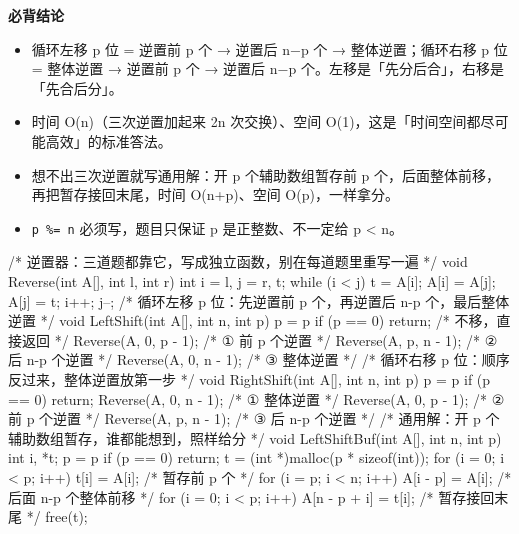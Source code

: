 \documentclass[10pt,a4paper]{ctexart}
\begin{document}



\textbf{必背结论}

\begin{itemize}

\item 循环左移 p 位 = 逆置前 p 个 → 逆置后 n−p 个 → 整体逆置；循环右移 p 位 = 整体逆置 → 逆置前 p 个 → 逆置后 n−p 个。左移是「先分后合」，右移是「先合后分」。

\item 时间 O(n)（三次逆置加起来 2n 次交换）、空间 O(1)，这是「时间空间都尽可能高效」的标准答法。

\item 想不出三次逆置就写通用解：开 p 个辅助数组暂存前 p 个，后面整体前移，再把暂存接回末尾，时间 O(n+p)、空间 O(p)，一样拿分。

\item \texttt{p \%= n} 必须写，题目只保证 p 是正整数、不一定给 p < n。

\end{itemize}

\begin{codebox}
/* 逆置器：三道题都靠它，写成独立函数，别在每道题里重写一遍 */
void Reverse(int A[], int l, int r) {
    int i = l, j = r, t;
    while (i < j) { t = A[i]; A[i] = A[j]; A[j] = t; i++; j--; }
}
/* 循环左移 p 位：先逆置前 p 个，再逆置后 n-p 个，最后整体逆置 */
void LeftShift(int A[], int n, int p) {
    p = p %
    if (p == 0) return;              /* 不移，直接返回 */
    Reverse(A, 0, p - 1);            /* ① 前 p 个逆置 */
    Reverse(A, p, n - 1);            /* ② 后 n-p 个逆置 */
    Reverse(A, 0, n - 1);            /* ③ 整体逆置 */
}
/* 循环右移 p 位：顺序反过来，整体逆置放第一步 */
void RightShift(int A[], int n, int p) {
    p = p %
    if (p == 0) return;
    Reverse(A, 0, n - 1);            /* ① 整体逆置 */
    Reverse(A, 0, p - 1);            /* ② 前 p 个逆置 */
    Reverse(A, p, n - 1);            /* ③ 后 n-p 个逆置 */
}
/* 通用解：开 p 个辅助数组暂存，谁都能想到，照样给分 */
void LeftShiftBuf(int A[], int n, int p) {
    int i, *t;
    p = p %
    if (p == 0) return;
    t = (int *)malloc(p * sizeof(int));
    for (i = 0; i < p; i++) t[i] = A[i];      /* 暂存前 p 个 */
    for (i = p; i < n; i++) A[i - p] = A[i];  /* 后面 n-p 个整体前移 */
    for (i = 0; i < p; i++) A[n - p + i] = t[i]; /* 暂存接回末尾 */
    free(t);
}
\end{codebox}
\end{document}

